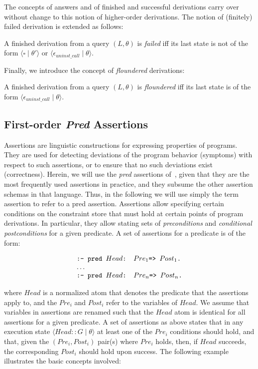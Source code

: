 \documentclass{llncs}
\newcommand{\kbd}[1]{\mbox{\tt #1}}
\newcommand{\gd}[0]{\mid}
\newcommand{\state}[2]
  {\ensuremath{\langle #1 \gd{} #2 \rangle}}
\newcommand{\emptyGoal}{\ensuremath{\square}}
\begin{document}
The concepts of answers and of finished and successful derivations
carry over without change to this notion of higher-order derivations.
The notion of (finitely) failed derivation is extended as follows:
\begin{definition}
  A finished derivation from a query $(L,\theta)$ is \emph{failed} iff
  its last state is not of the form $\state{\emptyGoal}{\theta'}$ or
  $\state{\epsilon_{uninst\_call}}{\theta}$.
\end{definition}
Finally, we introduce the concept of \emph{floundered} derivations:
\begin{definition}
  A finished derivation from a query $(L,\theta)$ is \emph{floundered}
  iff its last state is of the form 
  $\state{\epsilon_{uninst\_call}}{\theta}$.
\end{definition}




\subsection{First-order \emph{Pred} Assertions}
\label{sec:assertions}

Assertions are linguistic constructions for expressing properties of
programs. They are used for detecting deviations of the program
behavior (symptoms) with respect to such assertions, or to ensure
that no such deviations exist (correctness).
Herein,
we will use the \emph{pred} assertions
of~\cite{assert-lang-disciplbook-short},
given that they are the most frequently used assertions in practice,
and they subsume the other assertion schemas in that language.
Thus, in the following we will
use simply the term assertion to refer to a pred assertion.
Assertions allow specifying certain conditions on the
constraint store that must hold at certain points of program
derivations. In particular, they allow stating sets of
\emph{preconditions} and \emph{conditional postconditions} for a
given predicate.
A set of assertions for a predicate is of the form:
\begin{small}
  \[
  \begin{array}{l}
    \kbd{:- pred } Head \kbd{ : } Pre_1 \kbd{ => } Post_1 \kbd{.}
  \\
    \ldots
  \\
    \kbd{:- pred } Head \kbd{ : } Pre_n \kbd{ => } Post_n \kbd{.}
  \end{array}
  \]
\end{small}
where $Head$ is a normalized atom that denotes the predicate that the
assertions apply to, and the $Pre_i$ and $Post_i$ refer to the
variables of $Head$. We assume that variables in assertions are renamed
such that the $Head$ atom is identical for all assertions for a given
predicate.  A set of assertions as above states that in any execution
state $\state{Head :: G}{\theta}$
at least one of the $Pre_i$ conditions should hold, and that, given
the $(Pre_i,Post_i)$ pair(s) where $Pre_i$ holds, then, if $Head$
succeeds, the corresponding $Post_i$ should hold upon success.
The following example illustrates the basic concepts involved:
\end{document}
